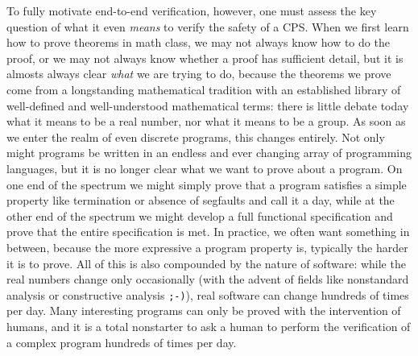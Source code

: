 \documentclass[12pt]{cmuthesis}
\theoremstyle{definition}
\theoremstyle{remark}
\begin{document}
To fully motivate end-to-end verification, however, one must assess the key question of what it even \emph{means} to verify the safety of a CPS.
When we first learn how to prove theorems in math class, we may not always know how to do the proof, or we may not always know whether a proof has sufficient detail, but it is almosts always clear \emph{what} we are trying to do, because the theorems we prove come from a longstanding mathematical tradition with an established library of well-defined and well-understood mathematical terms: there is little debate today what it means to be a real number, nor what it means to be a group.
As soon as we enter the realm of even discrete programs, this changes entirely. Not only might programs be written in an endless and ever changing array of programming languages, but it is no longer clear what we want to prove about a program. On one end of the spectrum we might simply prove that a program satisfies a simple property like termination or absence of segfaults and call it a day, while at the other end of the spectrum we might develop a full functional specification and prove that the entire specification is met. In practice, we often want something in between, because the more expressive a program property is, typically the harder it is to prove. All of this is also compounded by the nature of software: while the real numbers change only occasionally (with the advent of fields like nonstandard analysis or constructive analysis \texttt{;-)}), real software can change hundreds of times per day. Many interesting programs can only be proved with the intervention of humans, and it is a total nonstarter to ask a human to perform the verification of a complex program hundreds of times per day.
\end{document}
